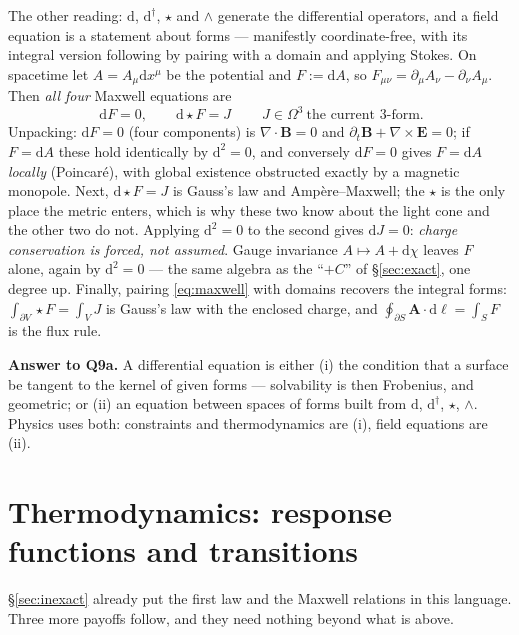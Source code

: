 \documentclass[10pt,a4paper]{article}
\newcommand{\dd}{\mathrm{d}}
\newcommand{\Om}{\Omega}
\newcommand{\A}{\mathbf{A}}
\newcommand{\B}{\mathbf{B}}
\newcommand{\E}{\mathbf{E}}
\theoremstyle{plain}
\theoremstyle{definition}
\numberwithin{equation}{section}
\begin{document}
The other reading: $\dd$, $\dd^\dagger$, $\star$ and $\wedge$ generate the differential
operators, and a field equation is a statement about forms --- manifestly coordinate-free, with
its integral version following by pairing with a domain and applying Stokes. On spacetime let
$A=A_\mu\dd x^\mu$ be the potential and $F:=\dd A$, so
$F_{\mu\nu}=\partial_\mu A_\nu-\partial_\nu A_\mu$. Then \emph{all four} Maxwell equations are
\begin{equation}
\boxed{\ \dd F=0,\qquad \dd\!\star\!F=J\ }
\qquad J\in\Om^3\ \text{the current $3$-form.}
\label{eq:maxwell}
\end{equation}
Unpacking: $\dd F=0$ (four components) is $\nabla\cdot\B=0$ and
$\partial_t\B+\nabla\times\E=0$; if $F=\dd A$ these hold identically by $\dd^2=0$, and
conversely $\dd F=0$ gives $F=\dd A$ \emph{locally} (Poincar\'e), with global existence
obstructed exactly by a magnetic monopole. Next, $\dd\star F=J$ is Gauss's law and
Amp\`ere--Maxwell; the $\star$ is the only place the metric enters, which is why these two know
about the light cone and the other two do not. Applying $\dd^2=0$ to the second gives
$\dd J=0$: \emph{charge conservation is forced, not assumed}. Gauge invariance
$A\mapsto A+\dd\chi$ leaves $F$ alone, again by $\dd^2=0$ --- the same algebra as the ``$+C$''
of \S\ref{sec:exact}, one degree up. Finally, pairing \eqref{eq:maxwell} with domains recovers
the integral forms: $\int_{\partial V}\star F=\int_VJ$ is Gauss's law with the enclosed charge,
and $\oint_{\partial S}\A\cdot\dd\boldsymbol\ell=\int_SF$ is the flux rule.

\begin{keybox}
\textbf{Answer to Q9a.} A differential equation is either (i) the condition that a surface be
tangent to the kernel of given forms --- solvability is then Frobenius, and geometric; or (ii)
an equation between spaces of forms built from $\dd$, $\dd^\dagger$, $\star$, $\wedge$. Physics
uses both: constraints and thermodynamics are (i), field equations are (ii).
\end{keybox}


\section{Thermodynamics: response functions and transitions}
\label{sec:thermo}

\S\ref{sec:inexact} already put the first law and the Maxwell relations in this language. Three
more payoffs follow, and they need nothing beyond what is above.
\end{document}

